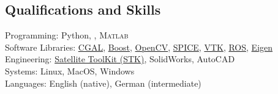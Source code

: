 \subsection*{Qualifications and Skills}
{}

Programming: Python, \CC, \textsc{Matlab} \\
Software Libraries: \href{https://www.cgal.org/}{CGAL}, \href{https://www.boost.org/}{Boost}, \href{https:://opencv.org/}{OpenCV}, \href{https://naif.jpl.nasa.gov/naif/toolkit.html}{SPICE}, \href{https://www.vtk.org}{VTK}, \href{http://www.ros.org}{ROS}, \href{https://eigen.tuxfamily.org/index.php?title=Main_Page}{Eigen} \\
Engineering: \href{http://www.agi.com/products/engineering-tools}{Satellite ToolKit (STK)}, SolidWorks, AutoCAD \\
Systems: Linux, MacOS, Windows \\
Languages: English (native), German (intermediate)
